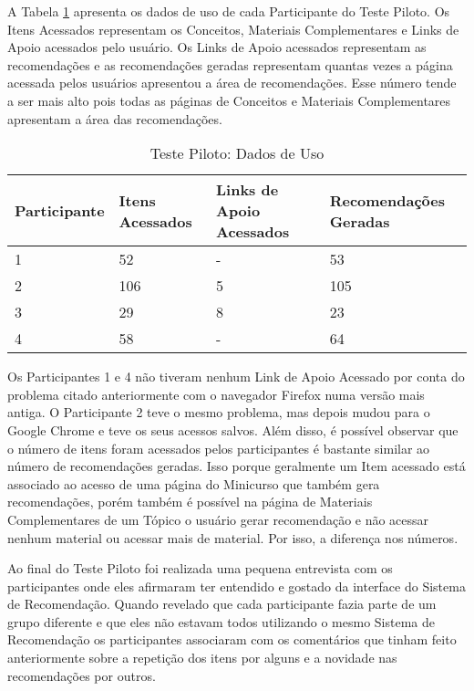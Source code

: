 A Tabela \ref{tab:teste-piloto-dados-de-uso} apresenta os dados de uso de cada Participante do Teste Piloto. Os Itens Acessados
representam os Conceitos, Materiais Complementares e Links de Apoio acessados pelo usuário. Os Links de Apoio acessados
representam as recomendações e as recomendações geradas representam quantas vezes a página acessada pelos usuários apresentou
a área de recomendações. Esse número tende a ser mais alto pois todas as páginas de Conceitos e Materiais Complementares
apresentam a área das recomendações.

\begin{table}[h]
\footnotesize
\caption[Teste Piloto: Dados de Uso]{Teste Piloto: Dados de Uso}
\label{tab:teste-piloto-dados-de-uso}
\centering
\begin{tabular}{|p{2cm}|p{3cm}|p{3cm}|p{3cm}|}
  \hline
  \textbf{Participante} & \textbf{Itens Acessados} & \textbf{Links de Apoio Acessados} & \textbf{Recomendações Geradas} \\
  \hline
  1            & 52              & -                        & 53                    \\
  \hline
  2            & 106             & 5                        & 105                   \\
  \hline
  3            & 29              & 8                        & 23                    \\
  \hline
  4            & 58              & -                        & 64                    \\
  \hline
\end{tabular}
\end{table}

Os Participantes 1 e 4 não tiveram nenhum Link de Apoio Acessado por conta do problema citado anteriormente com o navegador
Firefox numa versão mais antiga. O Participante 2 teve o mesmo problema, mas depois mudou para o Google Chrome e teve os
seus acessos salvos. Além disso, é possível observar que o número de itens foram acessados pelos participantes é bastante
similar ao número de recomendações geradas. Isso porque geralmente um Item acessado está associado ao acesso de uma página
do Minicurso que também gera recomendações, porém também é possível na página de Materiais Complementares de um Tópico o usuário
gerar recomendação e não acessar nenhum material ou acessar mais de material. Por isso, a diferença nos números.

Ao final do Teste Piloto foi realizada uma pequena entrevista com os participantes onde eles afirmaram ter entendido e gostado
da interface do Sistema de Recomendação. Quando revelado que cada participante fazia parte de um grupo diferente e que eles
não estavam todos utilizando o mesmo Sistema de Recomendação os participantes associaram com os comentários que tinham feito
anteriormente sobre a repetição dos itens por alguns e a novidade nas recomendações por outros.

